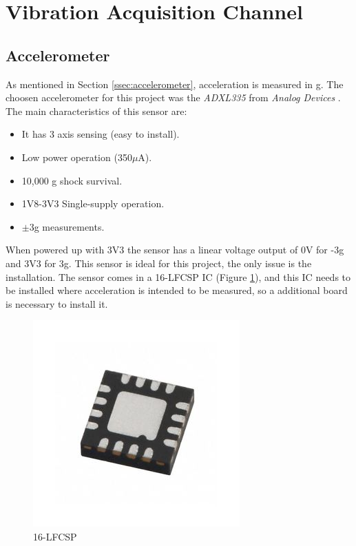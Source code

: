 \section{Vibration Acquisition Channel}\label{sec:vibration-acquisition-channel}

\subsection{Accelerometer}\label{ssec:accelerometer-signal}
	As mentioned in Section \ref{ssec:accelerometer}, acceleration is measured in g. The choosen accelerometer for this project was the \textit{ADXL335} from \textit{Analog Devices} \cite{devices2010adxl335}. The main characteristics of this sensor are:

	\begin{itemize}
		\item It has 3 axis sensing (easy to install).
		\item Low power operation (350$\mu$A).
		\item 10,000 g shock survival.
		\item 1V8-3V3 Single-supply operation.
		\item $\pm$3g measurements.
	\end{itemize}

	When powered up with 3V3 the sensor has a linear voltage output of 0V for -3g and 3V3 for 3g. This sensor is ideal for this project, the only issue is the installation. The sensor comes in a 16-LFCSP IC (Figure \ref{fig:16lfcsp}), and this IC needs to be installed where acceleration is intended to be measured, so a additional board is necessary to install it. 

	\begin{figure}[htbp]
		\centering
			\includegraphics[scale=2]{figuras/fig-16lfcsp.jpg}
		\caption{16-LFCSP \cite{16lfcsp}}
		\label{fig:16lfcsp}
	\end{figure}

